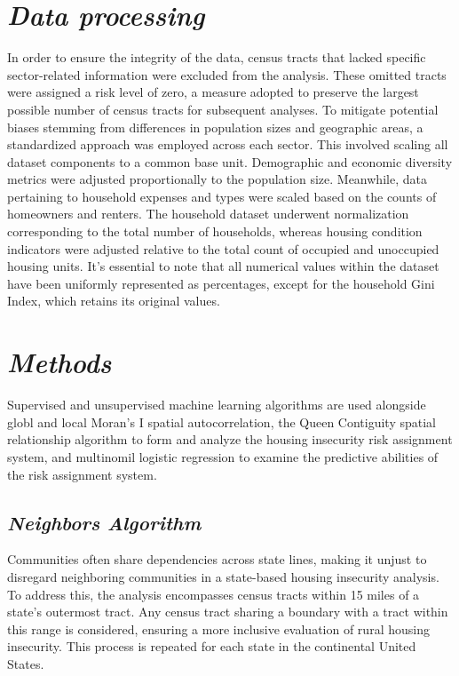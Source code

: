 \section{\textit{Data processing}}
In order to ensure the integrity of the data, census tracts that lacked specific sector-related information were excluded from the analysis. These omitted tracts were assigned a risk level of zero, a measure adopted to preserve the largest possible number of census tracts for subsequent analyses. To mitigate potential biases stemming from differences in population sizes and geographic areas, a standardized approach was employed across each sector. This involved scaling all dataset components to a common base unit. Demographic and economic diversity metrics were adjusted proportionally to the population size. Meanwhile, data pertaining to household expenses and types were scaled based on the counts of homeowners and renters. The household dataset underwent normalization corresponding to the total number of households, whereas housing condition indicators were adjusted relative to the total count of occupied and unoccupied housing units. It's essential to note that all numerical values within the dataset have been uniformly represented as percentages, except for the household Gini Index, which retains its original values.

\section{\textit{Methods}}
Supervised and unsupervised machine learning algorithms are used alongside globl and local Moran's I spatial autocorrelation, the Queen Contiguity spatial relationship algorithm to form and analyze the housing insecurity risk assignment system, and multinomil logistic regression to examine the predictive abilities of the risk assignment system.

\subsection{\textit{Neighbors Algorithm}}

Communities often share dependencies across state lines, making it unjust to disregard neighboring communities in a state-based housing insecurity analysis. To address this, the analysis encompasses census tracts within 15 miles of a state's outermost tract. Any census tract sharing a boundary with a tract within this range is considered, ensuring a more inclusive evaluation of rural housing insecurity. This process is repeated for each state in the continental United States.

